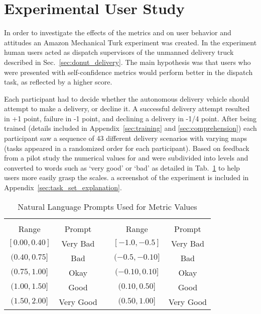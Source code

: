 \section{Experimental User Study} \label{sec:methodology}
    In order to investigate the effects of the metrics \xQ{} and \xO{} on user behavior and attitudes an Amazon Mechanical Turk experiment was created. In the experiment human users acted as dispatch supervisors of the unmanned delivery truck described in Sec.~\ref{sec:donut_delivery}. The main hypothesis was that users who were presented with self-confidence metrics would perform better in the dispatch task, as reflected by a higher score. %

    Each participant had to decide whether the autonomous delivery vehicle should attempt to make a delivery, or decline it. A successful delivery attempt resulted in +1 point, failure in -1 point, and declining a delivery in -1/4 point. After being trained (details included in Appendix~\ref{sec:training} and \ref{sec:comprehension}) each participant saw a sequence of 43 different delivery scenarios with varying maps (tasks appeared in a randomized order for each participant). Based on feedback from a pilot study the numerical values for \xQ{} and \xO{} were subdivided into levels and converted to words such as `very good' or `bad' as detailed in Tab.~\ref{tab:word_ranges} to help users more easily grasp the scales. a screenshot of the experiment is included in Appendix~\ref{sec:task_set_explanation}.

    \begin{table}[]
        \caption{Natural Language Prompts Used for Metric Values}
        \label{tab:word_ranges}
        \begin{tabular}{cclcc}
            \multicolumn{2}{c}{\xQ{}} & \vline & \multicolumn{2}{c}{\xO{}} \\
            Range & Prompt & \vline & Range & Prompt \\
            \hline
            $[0.00,0.40]$ & Very Bad & \vline & $[-1.0,-0.5]$ & Very Bad \\
            $(0.40,0.75]$ & Bad & \vline & $(-0.5,-0.10]$ & Bad \\
            $(0.75,1.00]$ & Okay & \vline & $(-0.10,0.10]$ & Okay \\
            $(1.00,1.50]$ & Good & \vline & $(0.10,0.50]$ & Good \\
            $(1.50,2.00]$ & Very Good & \vline & $(0.50,1.00]$ & Very Good
        \end{tabular}
        \vspace{-0.5cm}
    \end{table}

